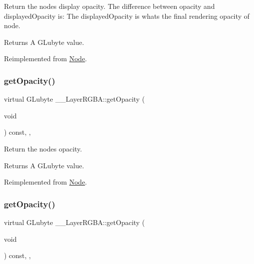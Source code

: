 Return the node\textquotesingle{}s display opacity. The difference between opacity and displayed\+Opacity is\+: The displayed\+Opacity is what\textquotesingle{}s the final rendering opacity of node. \begin{DoxyReturn}{Returns}
A G\+Lubyte value. 
\end{DoxyReturn}


Reimplemented from \hyperlink{classNode_ac4f9c61560c8862ebdaecbf79bf8a1b6}{Node}.

\mbox{\label{class____LayerRGBA_a61d071eeff8bc1c46520611261f5dd1a}} 
\subsubsection{\texorpdfstring{get\+Opacity()}{getOpacity()}\hspace{0.1cm}{\footnotesize\ttfamily [1/2]}}
{\footnotesize\ttfamily virtual G\+Lubyte \+\_\+\+\_\+\+Layer\+R\+G\+B\+A\+::get\+Opacity (\begin{DoxyParamCaption}\item[{void}]{ }\end{DoxyParamCaption}) const\hspace{0.3cm}{\ttfamily [inline]}, {\ttfamily [override]}, {\ttfamily [virtual]}}

Return the node\textquotesingle{}s opacity. \begin{DoxyReturn}{Returns}
A G\+Lubyte value. 
\end{DoxyReturn}


Reimplemented from \hyperlink{classNode_ab999cce3763ea09e74014245c770ea97}{Node}.

\mbox{\label{class____LayerRGBA_a61d071eeff8bc1c46520611261f5dd1a}} 
\subsubsection{\texorpdfstring{get\+Opacity()}{getOpacity()}\hspace{0.1cm}{\footnotesize\ttfamily [2/2]}}
{\footnotesize\ttfamily virtual G\+Lubyte \+\_\+\+\_\+\+Layer\+R\+G\+B\+A\+::get\+Opacity (\begin{DoxyParamCaption}\item[{void}]{ }\end{DoxyParamCaption}) const\hspace{0.3cm}{\ttfamily [inline]}, {\ttfamily [override]}, {\ttfamily [virtual]}}

